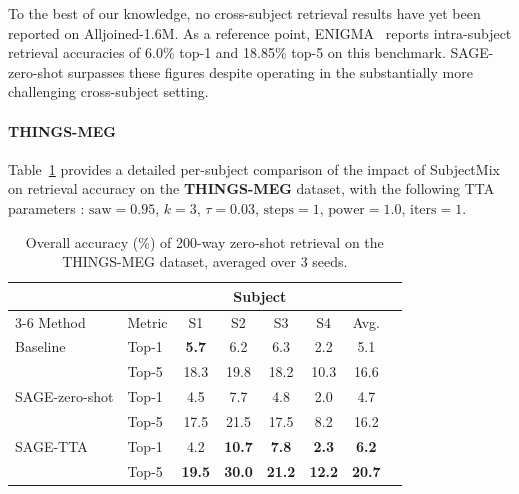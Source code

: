 \documentclass{article}
\begin{document}
To the best of our knowledge, no cross-subject retrieval results have yet been reported on Alljoined-1.6M. As a reference point, ENIGMA~\cite{kneeland2025enigma} reports intra-subject retrieval accuracies of 6.0\% top-1 and 18.85\% top-5 on this benchmark. SAGE-zero-shot surpasses these figures despite operating in the substantially more challenging cross-subject setting.

\paragraph{THINGS-MEG} Table~\ref{tab:sage-thingsmeg-results} provides a detailed per-subject comparison of the impact of SubjectMix on retrieval accuracy on the \textbf{THINGS-MEG}\cite{hebart2025thingsmeg} dataset, with the following TTA parameters : $\text{saw}=0.95$, $k=3$, $\tau=0.03$, $\text{steps}=1$, $\text{power}=1.0$, $\text{iters}=1$.

\begin{table}[H]
\caption{Overall accuracy (\%) of 200-way zero-shot retrieval on the THINGS-MEG dataset, averaged over 3 seeds.}
\label{tab:sage-thingsmeg-results}
\centering
\small
\setlength{\tabcolsep}{3.5pt}

\begin{tabular}{@{}llcccccc@{}}
\toprule
 & & \multicolumn{4}{c}{Subject} & \\
\cmidrule(lr){3-6}
Method & Metric & S1 & S2 & S3 & S4 & Avg.\\
\midrule
Baseline & Top-1 & \textbf{5.7} & 6.2 & 6.3 & 2.2 & 5.1 \\
         & Top-5 & 18.3 & 19.8 & 18.2 & 10.3 & 16.6 \\
\addlinespace[2pt]
\hdashline
\addlinespace[2pt]
SAGE-zero-shot & Top-1 & 4.5 & 7.7 & 4.8 & 2.0 & 4.7 \\
      & Top-5 & 17.5 & 21.5 & 17.5 & 8.2 & 16.2 \\
\addlinespace[2pt]
\hdashline
\addlinespace[2pt]
SAGE-TTA & Top-1 & 4.2 & \textbf{10.7} & \textbf{7.8} & \textbf{2.3} & \textbf{6.2} \\
            & Top-5 & \textbf{19.5} & \textbf{30.0} & \textbf{21.2} & \textbf{12.2} & \textbf{20.7} \\
\bottomrule
\end{tabular}%
\end{table}
\end{document}
